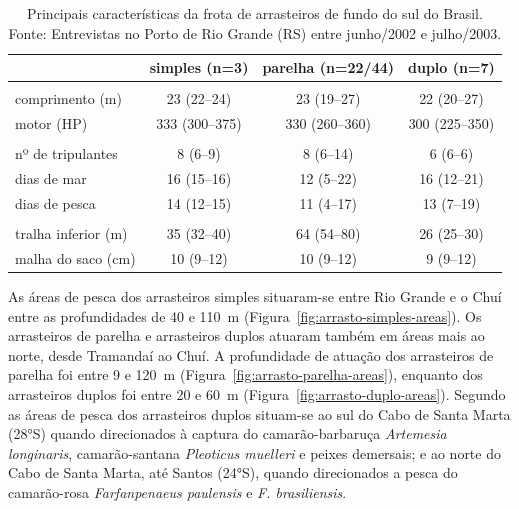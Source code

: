 \documentclass[a4paper,11pt,twoside,showtrims,onecolumn,openright,final]{memoir}
\begin{document}
%
%

\begin{table}
\caption[Principais características da frota de arrasteiros de fundo do sul do Brasil.]
        {Principais características da frota de arrasteiros de fundo do sul do Brasil. 
	 Fonte: Entrevistas no Porto de Rio Grande (RS) entre junho/2002 e julho/2003.}
\label{tab:caracteristicas-frotarrasto}
\begin{center}
\begin{tabular*}{\textwidth}{l@{\extracolsep{\fill}}ccc}
\toprule
			& simples (n=3)		& parelha (n=22/44)		& duplo (n=7)	\\
\midrule
			&			&				&		\\
comprimento (m)		& 23 (22--24)		& 23 (19--27)			& 22 (20--27)	\\
motor (HP)		& 333 (300--375)	& 330 (260--360)		& 300 (225--350)	\\
			&			&				&		\\
nº de tripulantes	& 8 (6--9)		& 8 (6--14)			& 6 (6--6)	\\
dias de mar		& 16 (15--16)		& 12 (5--22)			& 16 (12--21)	\\
dias de pesca		& 14 (12--15)		& 11 (4--17)			& 13 (7--19)	\\
			&			&				&		\\
tralha inferior (m)	& 35 (32--40)		& 64 (54--80)			& 26 (25--30)	\\
malha do saco (cm)	& 10 (9--12)		& 10 (9--12)			& 9 (9--12)	\\
\bottomrule
\end{tabular*}
\end{center}
\end{table}

As áreas de pesca dos arrasteiros simples situaram-se entre Rio Grande e o Chuí
entre as profundidades de 40 e 110~m (Figura~\ref{fig:arrasto-simples-areas}). 
Os arrasteiros de parelha e arrasteiros duplos atuaram também em áreas mais ao norte, 
desde Tramandaí ao Chuí. A profundidade de atuação dos arrasteiros de parelha foi entre 
9 e 120~m (Figura~\ref{fig:arrasto-parelha-areas}), 
enquanto dos arrasteiros duplos foi entre 20 e 60~m (Figura~\ref{fig:arrasto-duplo-areas}).
Segundo \citet{kotas1998} as áreas de pesca dos arrasteiros duplos situam-se ao sul 
do Cabo de Santa Marta (28°S) quando direcionados à captura do camarão-barbaruça \emph{Artemesia longinaris}, 
camarão-santana \emph{Pleoticus muelleri} e peixes demersais; e ao norte do Cabo de 
Santa Marta, até Santos (24°S), quando direcionados a pesca do 
camarão-rosa \emph{Farfanpenaeus paulensis} e \emph{F. brasiliensis}.
\end{document}
